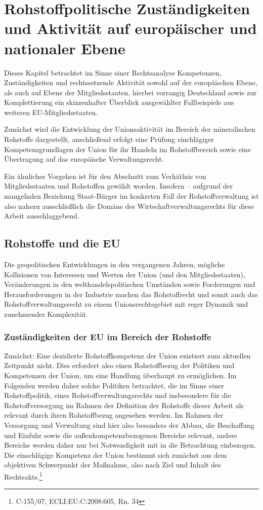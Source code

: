 \documentclass[12pt,a4paper,oneside]{book} %
\begin{document}
	
\chapter{Rohstoffpolitische Zuständigkeiten und Aktivität auf europäischer und nationaler Ebene}

Dieses Kapitel betrachtet im Sinne einer Rechtsanalyse Kompetenzen, Zuständigkeiten und rechtssetzende Aktivität sowohl auf der europäischen Ebene, als auch auf Ebene der Mitgliedsstaaten, hierbei vorrangig Deutschland sowie zur Komplettierung ein skizzenhafter Überblick ausgewählter Fallbeispiele aus weiteren EU-Mitgliedsstaaten.	

Zunächst wird die Entwicklung der Unionsaktivität im Bereich der mineralischen Rohstoffe dargestellt, anschließend erfolgt eine Prüfung einchlägiger Kompetenzgrundlagen der Union für ihr Handeln im Rohstoffbereich sowie eine Übertragung auf das europäische Verwaltungsrecht.

Ein ähnliches Vorgehen ist für den Abschnitt zum Verhätlnis von Mitgliedsstaaten und Rohstoffen gewählt worden. Insofern -- aufgrund der mangelnden Beziehung Staat-Bürger im konkreten Fall der Rohstoffverwaltung ist also nahezu ausschließlich die Domäne des Wirtschaftverwaltungsrechts für diese Arbeit ausschlaggebend.
	
\section{Rohstoffe und die EU}

Die geopolitischen Entwicklungen in den vergangenen Jahren, mögliche Kollisionen von Interessen und Werten der Union (und den Mitgliedsstaaten), Veränderungen in den welthandelspolitischen Umständen sowie Forderungen und Herausforderungen in der Industrie machen das Rohstoffrecht und somit auch das Rohstoffverwaltungsrecht zu einem Unionsrechtsgebiet mit reger Dynamik und zunehmender Komplexität.
	
\subsection{Zuständigkeiten der EU im Bereich der Rohstoffe}
	
Zunächst: Eine dezidierte Rohstoffkompetenz der Union existiert zum aktuellen Zeitpunkt nicht. Dies erfordert also einen Rohstoffbezug der Politiken und Kompetenzen der Union, um eine Handlung überhaupt zu ermöglichen. Im Folgenden werden daher solche Politiken betrachtet, die im Sinne einer Rohstoffpolitik, eines Rohstoffverwaltungsrechts und insbesondere für die Rohstoffversorgung im Rahmen der Definition der Rohstoffe dieser Arbeit als relevant durch ihren Rohstoffbezug angesehen werden. Im Rahmen der Versorgung und Verwaltung sind hier also besonders der Abbau, die Beschaffung und Einfuhr sowie die außenkompetenzbezogenen Bereiche relevant, andere Bereiche werden daher nur bei Notwendigkeit mit in die Betrachtung einbezogen. Die einschlägige Kompetenz der Union bestimmt sich zunächst aus dem objektiven Schwerpunkt der Maßnahme, also nach Ziel und Inhalt des Rechtsakts.\footnote{C-155/07, ECLI:EU:C:2008:605, Rn. 34}
	
\end{document}
